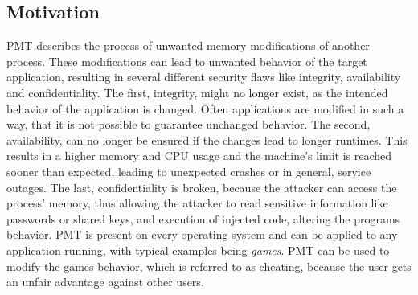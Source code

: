 \subsection{Motivation}
\gls{PMT} describes the process of unwanted memory modifications of another process. These modifications can lead to unwanted behavior of the target application, resulting in several different security flaws like integrity, availability and confidentiality. The first, integrity, might no longer exist, as the intended behavior of the application is changed. Often applications are modified in such a way, that it is not possible to guarantee unchanged behavior. The second, availability, can no longer be ensured if the changes lead to longer runtimes. This results in a higher memory and CPU usage and the machine's limit is reached sooner than expected, leading to unexpected crashes or in general, service outages. The last, confidentiality is broken, because the attacker can access the process' memory, thus allowing the attacker to read sensitive information like passwords or shared keys, and execution of injected code, altering the programs behavior. \gls{PMT} is present on every operating system and can be applied to any application running, with typical examples being \emph{games}. \gls{PMT} can be used to modify the games behavior, which is referred to as cheating, because the user gets an unfair advantage against other users.